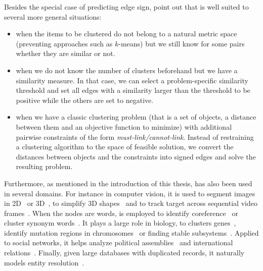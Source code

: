 Besides the special case of predicting edge sign, \textcite[Section 5]{Demaine2006} point out that
\pcc{} is well suited to several more general situations:
\begin{itemize}
   \item when the items to be clustered do not belong to a natural metric space (preventing
      approaches such as $k$-means) but we still know for some pairs whether they are similar or
      not.
   \item when we do not know the number of clusters beforehand but we have a similarity measure. In
      that case, we can select a problem-specific similarity threshold and set all edges with a
      similarity larger than the threshold to be positive while the others are set to negative.
   \item when we have a classic clustering problem (that is a set of objects, a distance between
      them and an objective function to minimize) with additional pairwise constraints of the form
      \emph{must-link/cannot-link}. Instead of restraining a clustering algorithm to the space of
      feasible solution, we convert the distances between objects and the constraints into signed
      edges and solve the resulting \pcc{} problem. 
\end{itemize}

Furthermore, as mentioned in the introduction of this thesis, \pcc{} has also been used in several
domains. For instance in computer vision, it is used to segment images in
2D~\autocites{Kim2011}{Bagon2011}{CellSeg14} or 3D~\autocites{VolumeSegmentation12}{Beier2015}, to
simplify 3D shapes~\autocite{Shape3D17} and to track target across sequential video
frames~\autocite{multiTracking15}. When the nodes are words, \pcc{} is employed to identify
coreference~\autocites{graphicalCoreference04}{Elsner2009} or cluster synonym
words~\autocite{SignedWordRatings}. It plays a large role in biology, to clusters
genes~\autocite{Ben-Dor99}, identify mutation regions in chromosomes~\autocite{Das2015} or finding
stable subsystems~\autocite{monotoneBiology07}. Applied to social networks, it helps analyze
political assemblies~\autocites{Mendonca2015}{Jiang2015}{BrazilCC17} and international
relations~\autocites{Traag2009}{CommunityUN12}. Finally, given large databases with duplicated
records, it naturally models entity
resolution~\autocites{Crosslingual07}{DeDup09}{LargeScaleDeDup09}{WeightedER14}.

